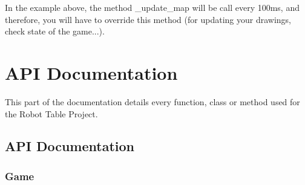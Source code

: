 \documentclass[letterpaper,10pt,english]{sphinxmanual}
\begin{document}
In the example above, the method \_update\_map will be call every 100ms, and therefore, you will have to override this method (for updating your drawings, check state of the game...).


\chapter{API Documentation}
\label{index:api-documentation}
This part of the documentation details every function, class or method
used for the Robot Table Project.


\section{API Documentation}
\label{api:api-documentation}\label{api::doc}

\subsection{Game}
\label{api:game}
\end{document}
